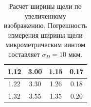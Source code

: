 \begin{table}[h]
\begin{tabular}{|c|c|c|c|}
1.12                                                                     & 3.00                                                                                     & 1.15                                                                                              & 0.17                                                                                                                   \\ \hline
1.22                                                                     & 3.30                                                                                     & 1.26                                                                                              & 0.18                                                                                                                   \\ \hline
1.32                                                                     & 3.55                                                                                     & 1.35                                                                                              & 0.20                                                                                                                   \\ \hline
\end{tabular}
\caption{Расчет ширины щели по увеличенному изображению. Погрешность измерения ширины щели микрометрическим винтом составляет $\sigma_D = 10$ мкм.}
\label{tab:A1}
\end{table}